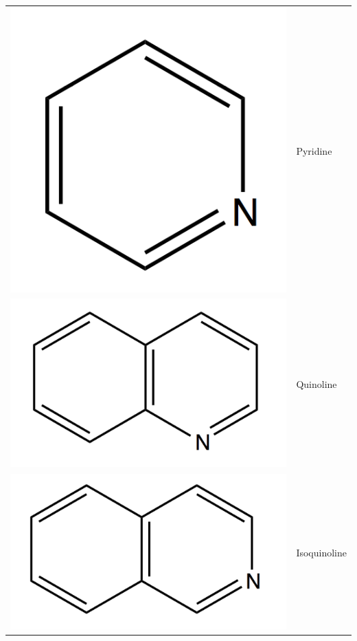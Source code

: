 \begin{table}[h!]
	\begin{center}
		\begin{tabular}{rl}
			\hline
			\includegraphics[scale=0.08]{image/pyridine} & Pyridine \\
			\includegraphics[scale=0.08]{image/quinoline} & Quinoline \\
			\includegraphics[scale=0.08]{image/isoquinoline} & Isoquinoline \\

\end{tabular}
\end{center}
\end{table}
